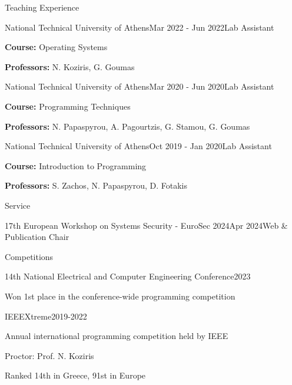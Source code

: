 \documentclass[letterpaper, 11pt]{resume}
\begin{document}
\begin{rSection}{Teaching Experience}
    \begin{rSubsection}{National Technical University of Athens}{Mar 2022 - Jun 2022}{Lab Assistant}{}
        \item \textbf{Course:} Operating Systems
        \item \textbf{Professors:} N. Koziris, G. Goumas
    \end{rSubsection}
    \begin{rSubsection}{National Technical University of Athens}{Mar 2020 - Jun 2020}{Lab Assistant}{}
        \item \textbf{Course:} Programming Techniques
        \item \textbf{Professors:} N. Papaspyrou, A. Pagourtzis, G. Stamou, G. Goumas
    \end{rSubsection}
    \begin{rSubsection}{National Technical University of Athens}{Oct 2019 - Jan 2020}{Lab Assistant}{}
        \item \textbf{Course:} Introduction to Programming
        \item \textbf{Professors:} S. Zachos, N. Papaspyrou, D. Fotakis
    \end{rSubsection}
\end{rSection}



\begin{rSection}{Service}
    \begin{rSubsection}{17th European Workshop on Systems Security - EuroSec 2024}{Apr 2024}{Web \& Publication Chair}{}
        \item[]
    \end{rSubsection}
    \vspace{-4ex}
\end{rSection}

\begin{rSection}{Competitions}
    \begin{rSubsection}{14th National Electrical and Computer Engineering Conference}{2023}{}{}
        \item Won 1st place in the conference-wide programming competition
    \end{rSubsection}

    \begin{rSubsection}{IEEEXtreme}{2019-2022}{}{}
        \item Annual international programming competition held by IEEE
        \item Proctor: Prof. N. Koziris
        \item Ranked 14th in Greece, 91st in Europe
    \end{rSubsection}
\end{rSection}
\end{document}
